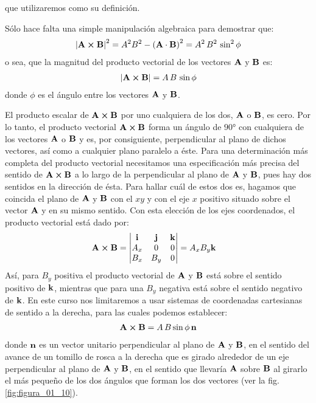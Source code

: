 \documentclass[12pt]{article}
\begin{document}
que utilizaremos como su definición.
\par
Sólo hace falta una simple manipulación algebraica para demostrar que:
\begin{align*}
\abs{\vb{A} \cp \vb{B}}^{2} = A^{2} B^{2} - \left( \vb{A} \cdot \vb{B} \right)^{2} =  A^{2} \, B^{2} \, \sin^{2} \phi
\end{align*}
o sea, que la magnitud del producto vectorial de los vectores $\vb{A}$ y $\vb{B}$ es:
\begin{align}
    \abs{\vb{A} \cp \vb{B}} = A \, B \, \sin \phi
    \label{eq:ecuacion_01_23}
\end{align}
donde $\phi$ es el ángulo entre los vectores $\vb{A}$ y $\vb{B}$. 
\par
El producto escalar de $\vb{A} \cp \vb{B}$ por uno cualquiera de los dos, $\vb{A}$ o $\vb{B}$, es cero. Por lo tanto, el producto vectorial $\vb{A} \cp \vb{B}$ forma un ángulo de $\ang{90}$ con cualquiera de los vectores $\vb{A}$ o $\vb{B}$ y es, por consiguiente, 
perpendicular al plano de dichos vectores, así como a cualquier plano paralelo a éste. Para una determinación más completa del producto vectorial necesitamos una especificación más precisa del sentido de $\vb{A} \cp \vb{B}$ a lo largo de la perpendicular al plano de $\vb{A}$ y $\vb{B}$, pues hay dos sentidos en la dirección de ésta. Para hallar cuál de estos dos es, hagamos que coincida el plano de $\vb{A}$ y $\vb{B}$ con el $x y$ y con el eje $x$ positivo situado sobre el vector $\vb{A}$ y en su mismo sentido. Con esta elección de los ejes coordenados, el producto vectorial está dado por:
\begin{align*}
\vb{A} \cp \vb{B} &= \mdet{
    \vb{i} & \vb{j} & \vb{k} \\
    A_{x} & 0 & 0 \\
    B_{x} & B_{y} & 0 } = A_{x} B_{y} \vb{k}
\end{align*}
Así, para $B_{y}$ positiva el producto vectorial de $\vb{A}$ y $\vb{B}$ está sobre el sentido positivo de $\vb{k}$, mientras que para una $B_{y}$ negativa está sobre el sentido negativo de $\vb{k}$. En este curso nos limitaremos a usar sistemas de coordenadas cartesianas de sentido a la derecha, para las cuales podemos establecer:
\begin{align}
    \vb{A} \cp \vb{B} = A \,B \sin \phi \, \vb{n}
    \label{eq:ecuacion_01_24}
\end{align}
donde $\vb{n}$ es un vector unitario perpendicular al plano de $\vb{A}$ y $\vb{B}$, en el sentido del avance de un tomillo de rosca a la derecha que es girado alrededor de un eje perpendicular al plano de $\vb{A}$ y $\vb{B}$, en el sentido que llevaría $\vb{A}$ sobre $\vb{B}$ al girarlo el más pequeño de los dos ángulos que forman los dos vectores (ver la fig. \ref{fig:figura_01_10}).
\end{document}

